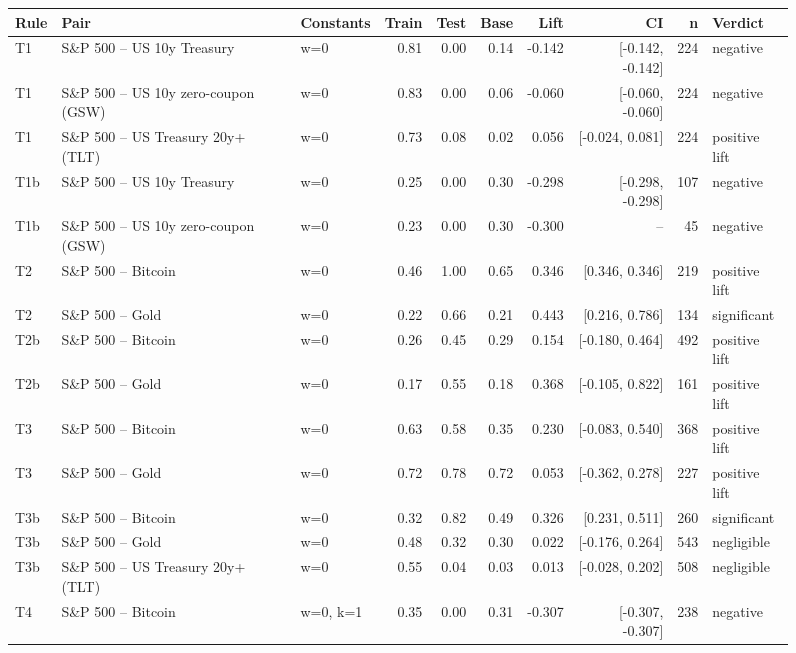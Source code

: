 \begin{figure}
\centering
\begin{tabular}{lllrrrrrrl}
\toprule
Rule & Pair & Constants & Train & Test & Base & Lift & CI & n & Verdict \\
\midrule
T1 & S\&P 500 -- US 10y Treasury & w=0 & 0.81 & 0.00 & 0.14 & -0.142 & [-0.142, -0.142] & 224 & negative \\
T1 & S\&P 500 -- US 10y zero-coupon (GSW) & w=0 & 0.83 & 0.00 & 0.06 & -0.060 & [-0.060, -0.060] & 224 & negative \\
T1 & S\&P 500 -- US Treasury 20y+ (TLT) & w=0 & 0.73 & 0.08 & 0.02 & 0.056 & [-0.024, 0.081] & 224 & positive lift \\
T1b & S\&P 500 -- US 10y Treasury & w=0 & 0.25 & 0.00 & 0.30 & -0.298 & [-0.298, -0.298] & 107 & negative \\
T1b & S\&P 500 -- US 10y zero-coupon (GSW) & w=0 & 0.23 & 0.00 & 0.30 & -0.300 & -- & 45 & negative \\
T2 & S\&P 500 -- Bitcoin & w=0 & 0.46 & 1.00 & 0.65 & 0.346 & [0.346, 0.346] & 219 & positive lift \\
T2 & S\&P 500 -- Gold & w=0 & 0.22 & 0.66 & 0.21 & 0.443 & [0.216, 0.786] & 134 & significant \\
T2b & S\&P 500 -- Bitcoin & w=0 & 0.26 & 0.45 & 0.29 & 0.154 & [-0.180, 0.464] & 492 & positive lift \\
T2b & S\&P 500 -- Gold & w=0 & 0.17 & 0.55 & 0.18 & 0.368 & [-0.105, 0.822] & 161 & positive lift \\
T3 & S\&P 500 -- Bitcoin & w=0 & 0.63 & 0.58 & 0.35 & 0.230 & [-0.083, 0.540] & 368 & positive lift \\
T3 & S\&P 500 -- Gold & w=0 & 0.72 & 0.78 & 0.72 & 0.053 & [-0.362, 0.278] & 227 & positive lift \\
T3b & S\&P 500 -- Bitcoin & w=0 & 0.32 & 0.82 & 0.49 & 0.326 & [0.231, 0.511] & 260 & significant \\
T3b & S\&P 500 -- Gold & w=0 & 0.48 & 0.32 & 0.30 & 0.022 & [-0.176, 0.264] & 543 & negligible \\
T3b & S\&P 500 -- US Treasury 20y+ (TLT) & w=0 & 0.55 & 0.04 & 0.03 & 0.013 & [-0.028, 0.202] & 508 & negligible \\
T4 & S\&P 500 -- Bitcoin & w=0, k=1 & 0.35 & 0.00 & 0.31 & -0.307 & [-0.307, -0.307] & 238 & negative \\

\end{tabular}
\end{figure}
